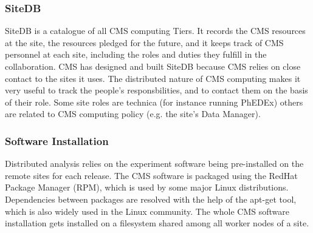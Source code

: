 \subsubsection{ SiteDB }
\label{sec:4_1_2}
SiteDB is a catalogue of all CMS computing Tiers.
It records the CMS resources at the site, the resources pledged for the future,
and it keeps track of CMS personnel at each site, including the roles
and duties they fulfill in the collaboration.
CMS has designed and built SiteDB because CMS relies on close contact
to the sites it uses. The distributed nature of CMS computing makes
it very useful to track the people's responsbilities, and to contact
them on the basis of their role. Some site roles are technica
 (for instance running PhEDEx) others are related to CMS computing
 policy (e.g. the site's Data Manager).

\subsubsection{ Software Installation }
\label{sec:4_1_3}
Distributed analysis relies on the experiment software being
pre-installed on the remote sites for each release. The CMS software
is packaged using the RedHat Package Manager (RPM), which is used by
some major Linux distributions. Dependencies between packages are
resolved with the help of the apt-get tool, which is also widely used in
the Linux community. The whole CMS software installation gets installed
on a filesystem shared among all worker nodes of a site.

